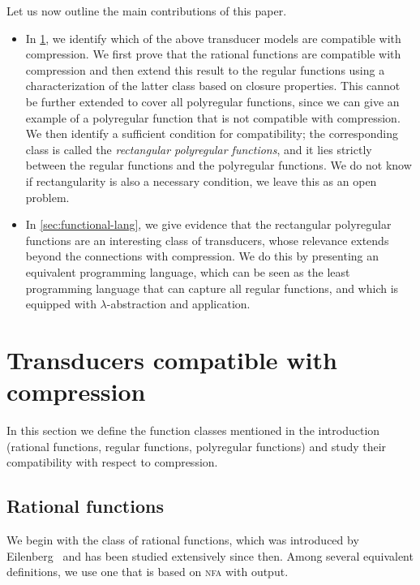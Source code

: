 \documentclass[a4paper,UKenglish,cleveref, autoref, thm-restate]{lipics-v2021}
\newcommand{\nfa}{{\textsc{nfa}}\xspace}
\begin{document}
Let us now outline the main contributions of this paper.
\begin{itemize}
    \item In \cref{sec:compatible}, we identify which of the above transducer models are compatible with compression. We  first prove that the rational functions are compatible with compression and then extend this result to the regular functions using
a characterization of the latter class based on closure properties. This cannot be further extended to cover all polyregular functions, since we can  give an example of a 
polyregular function that is not compatible with compression. We then  identify a sufficient condition for compatibility; the corresponding class is called  the \emph{rectangular polyregular functions}, and it lies strictly between the regular functions and the polyregular functions. We do not know if rectangularity is also a necessary condition, we leave this as an open problem.
    \item In \cref{sec:functional-lang}, we give evidence that  the rectangular polyregular functions are an interesting class of transducers, whose relevance extends beyond the connections with compression. We do this by presenting an equivalent programming language, which can be seen as  the least programming language that can capture all regular functions, and which is equipped with $\lambda$-abstraction and application.
\end{itemize}


\section{Transducers compatible with compression}
\label{sec:compatible}

In this section we define the function classes mentioned in the introduction (rational functions, regular functions,
polyregular functions) and study their compatibility with respect to compression.

\subsection{Rational functions}
\label{sec:rational}
We begin with the class of rational functions, which was introduced by Eilenberg~\cite[Chapter IX]{Eilenberg74} and has been studied extensively since then. Among several equivalent definitions, we use one that is based on \nfa with output.
\end{document}
